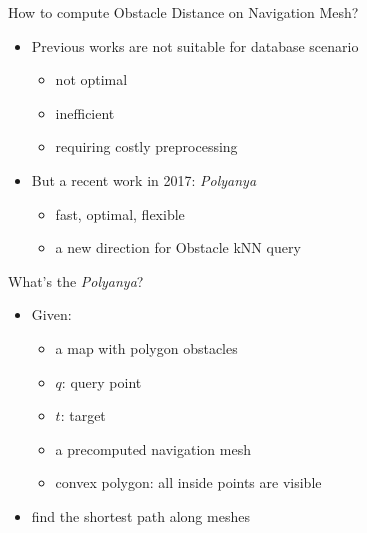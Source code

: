 \begin{frame}{How to compute Obstacle Distance on Navigation Mesh?}
\begin{itemize}
    \item Previous works are not suitable for database scenario
    \begin{itemize}
        \item not optimal
        \item inefficient
        \item requiring costly preprocessing
    \end{itemize}
    \item \small But a recent work in 2017: \textit{Polyanya}
    \begin{itemize}
        \item fast, optimal, flexible
        \item a new direction for Obstacle kNN query
    \end{itemize}
    
\end{itemize}
\end{frame}

\begin{frame}{What's the \textit{Polyanya}?}

\begin{minipage}{.4\textwidth}
\begin{itemize}
    \item<1-> \small Given:
    \begin{itemize}
        \item \small a map with polygon obstacles
        \item \small $q$: query point
        \item \small $t$: target
        \item \small a precomputed navigation mesh
        \item \small convex polygon: all inside points are visible
    \end{itemize}
    \item \small find the shortest path along meshes
\end{itemize}

\end{minipage}%
\begin{minipage}{.6\textwidth}
\begin{adjustbox}{max totalsize={.9\textwidth}{.9\textheight}, right}
\end{adjustbox}
\end{minipage}
\end{frame}

